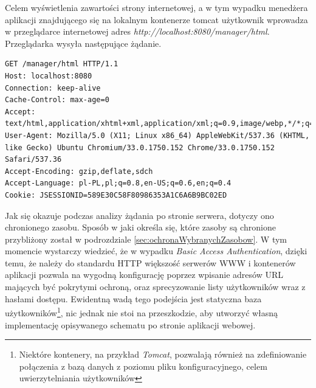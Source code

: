 \documentclass[11pt]{aghdpl}
\begin{document}

Celem wyświetlenia zawartości strony internetowej, a w tym wypadku menedżera aplikacji znajdującego się na lokalnym kontenerze tomcat użytkownik wprowadza w przeglądarce internetowej adres \emph{http://localhost:8080/manager/html}. Przeglądarka wysyła następujące żądanie.
\begin{lstlisting}
GET /manager/html HTTP/1.1
Host: localhost:8080
Connection: keep-alive
Cache-Control: max-age=0
Accept: text/html,application/xhtml+xml,application/xml;q=0.9,image/webp,*/*;q=0.8
User-Agent: Mozilla/5.0 (X11; Linux x86_64) AppleWebKit/537.36 (KHTML, like Gecko) Ubuntu Chromium/33.0.1750.152 Chrome/33.0.1750.152 Safari/537.36
Accept-Encoding: gzip,deflate,sdch
Accept-Language: pl-PL,pl;q=0.8,en-US;q=0.6,en;q=0.4
Cookie: JSESSIONID=589E30C58F80986353A1C6A6B9BC02ED
\end{lstlisting}

Jak się okazuje podczas analizy żądania po stronie serwera, dotyczy ono chronionego zasobu. Sposób w jaki określa się, które zasoby są chronione przybliżony został w podrozdziale \ref{sec:ochronaWybranychZasobow}. W tym momencie wystarczy wiedzieć, że w wypadku \emph{Basic Access Authentication}, dzięki temu, że należy do standardu HTTP większość serwerów WWW i kontenerów aplikacji pozwala na wygodną konfigurację poprzez wpisanie adresów URL mających być pokrytymi ochroną, oraz sprecyzowanie listy użytkowników wraz z hasłami dostępu. Ewidentną wadą tego podejścia jest statyczna baza użytkowników\footnote{Niektóre kontenery, na przykład \emph{Tomcat}, pozwalają również na zdefiniowanie połączenia z bazą danych z poziomu pliku konfiguracyjnego, celem uwierzytelniania użytkowników}, nic jednak nie stoi na przeszkodzie, aby utworzyć własną implementację opisywanego schematu po stronie aplikacji webowej.
\end{document}
